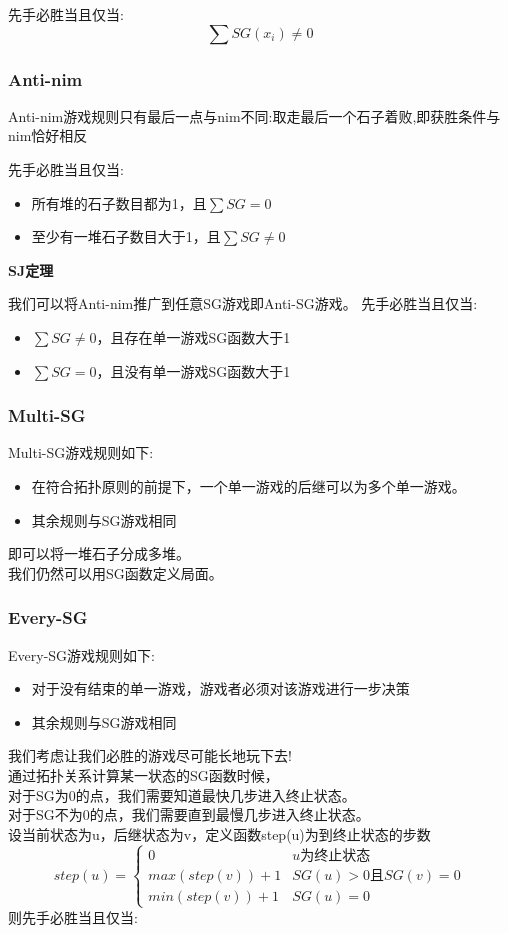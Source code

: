\documentclass{article}
\begin{document}
先手必胜当且仅当:
$$\sum SG(x_i) \neq 0$$

\subsubsection{Anti-nim}

Anti-nim游戏规则只有最后一点与nim不同:取走最后一个石子着败,即获胜条件与nim恰好相反

先手必胜当且仅当:
\begin{itemize}
\item 所有堆的石子数目都为1，且$\sum SG = 0$
\item 至少有一堆石子数目大于1，且$\sum SG \neq 0$
\end{itemize}

\textbf{SJ定理}

我们可以将Anti-nim推广到任意SG游戏即Anti-SG游戏。
先手必胜当且仅当:
\begin{itemize}
\item $\sum SG \neq 0$，且存在单一游戏SG函数大于1
\item $\sum SG = 0$，且没有单一游戏SG函数大于1
\end{itemize}

\subsubsection{Multi-SG}

Multi-SG游戏规则如下:
\begin{itemize}
\item 在符合拓扑原则的前提下，一个单一游戏的后继可以为多个单一游戏。
\item 其余规则与SG游戏相同
\end{itemize}

即可以将一堆石子分成多堆。\\
我们仍然可以用SG函数定义局面。

\subsubsection{Every-SG}

Every-SG游戏规则如下:
\begin{itemize}
\item 对于没有结束的单一游戏，游戏者必须对该游戏进行一步决策
\item 其余规则与SG游戏相同
\end{itemize}

我们考虑让我们必胜的游戏尽可能长地玩下去!	\\
通过拓扑关系计算某一状态的SG函数时候，	\\
对于SG为0的点，我们需要知道最快几步进入终止状态。	\\
对于SG不为0的点，我们需要直到最慢几步进入终止状态。	\\
设当前状态为u，后继状态为v，定义函数step(u)为到终止状态的步数		\\
$$
step(u) = \begin{cases} 
0              & u \text{为终止状态} \\ 
max(step(v))+1 & SG(u)>0 \text{且} SG(v)=0 \\ 
min(step(v))+1 & SG(u)=0 
\end{cases}
$$
则先手必胜当且仅当:
\end{document}
